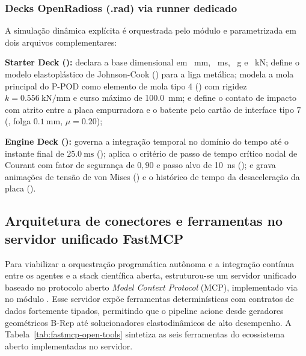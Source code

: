 \subsubsection{Decks OpenRadioss (.rad) via runner dedicado}
\label{subsubsec:openradioss}
A simulação dinâmica explícita é orquestrada pelo módulo  e parametrizada em dois arquivos complementares:
\begin{alineas}
  \item \textbf{Starter Deck ():} declara a base dimensional em \SI{}{\milli\metre}, \SI{}{\milli\second}, \SI{}{\gram} e \SI{}{\kilo\newton}; define o modelo elastoplástico de Johnson-Cook () para a liga metálica; modela a mola principal do P-POD como elemento de mola tipo 4 () com rigidez $k = \SI{0.556}{\kilo\newton\per\milli\metre}$ e curso máximo de \SI{100.0}{\milli\metre}; e define o contato de impacto com atrito entre a placa empurradora e o batente pelo cartão de interface tipo 7 (, folga $\SI{0.1}{\milli\metre}$, $\mu = \num{0.20}$);
  \item \textbf{Engine Deck ():} governa a integração temporal no domínio do tempo até o instante final de $\SI{25.0}{\milli\second}$ (); aplica o critério de passo de tempo crítico nodal de Courant com fator de segurança de $0{,}90$ e passo alvo de \SI{10}{\nano\second} (); e grava animações de tensão de von Mises () e o histórico de tempo da desaceleração da placa ().
\end{alineas}

\subsection{Arquitetura de conectores e ferramentas no servidor unificado FastMCP}
\label{subsec:fastmcp-tools}

Para viabilizar a orquestração programática autônoma e a integração contínua entre os agentes e a stack científica aberta, estruturou-se um servidor unificado baseado no protocolo aberto \textit{Model Context Protocol} (MCP), implementado via  no módulo . Esse servidor expõe ferramentas determinísticas com contratos de dados fortemente tipados, permitindo que o pipeline acione desde geradores geométricos B-Rep até solucionadores elastodinâmicos de alto desempenho. A Tabela~\ref{tab:fastmcp-open-tools} sintetiza as seis ferramentas do ecossistema aberto implementadas no servidor.

